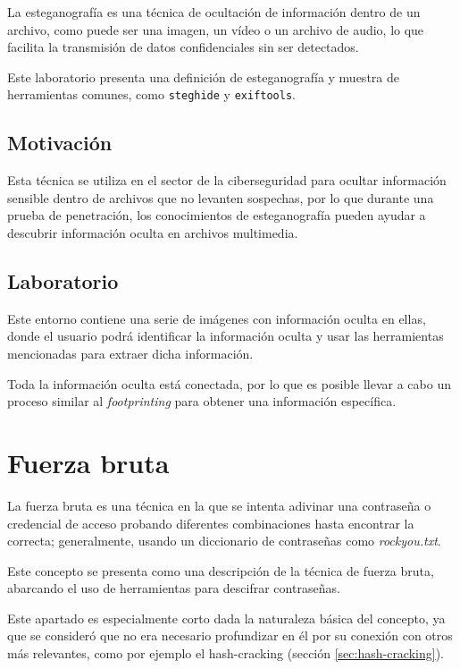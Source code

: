         La esteganografía es una técnica de ocultación de información dentro de un archivo, como puede ser una imagen, un vídeo o un archivo de audio, lo que facilita la transmisión de datos confidenciales sin ser detectados.

        Este laboratorio presenta una definición de esteganografía y muestra de herramientas comunes, como \texttt{steghide} y \texttt{exiftools}.

        \subsection{Motivación}

            Esta técnica se utiliza en el sector de la ciberseguridad para ocultar información sensible dentro de archivos que no levanten sospechas, por lo que durante una prueba de penetración, los conocimientos de esteganografía pueden ayudar a descubrir información oculta en archivos multimedia.

        \subsection{Laboratorio}

            Este entorno contiene una serie de imágenes con información oculta en ellas, donde el usuario podrá identificar la información oculta y usar las herramientas mencionadas para extraer dicha información.

            Toda la información oculta está conectada, por lo que es posible llevar a cabo un proceso similar al \textit{footprinting} para obtener una información específica.


    \section{Fuerza bruta}

        La fuerza bruta es una técnica en la que se intenta adivinar una contraseña o credencial de acceso probando diferentes combinaciones hasta encontrar la correcta; generalmente, usando un diccionario de contraseñas como \textit{rockyou.txt}.

        Este concepto se presenta como una descripción de la técnica de fuerza bruta, abarcando el uso de herramientas para descifrar contraseñas.

        Este apartado es especialmente corto dada la naturaleza básica del concepto, ya que se consideró que no era necesario profundizar en él por su conexión con otros más relevantes, como por ejemplo el hash-cracking (sección \ref{sec:hash-cracking}).

